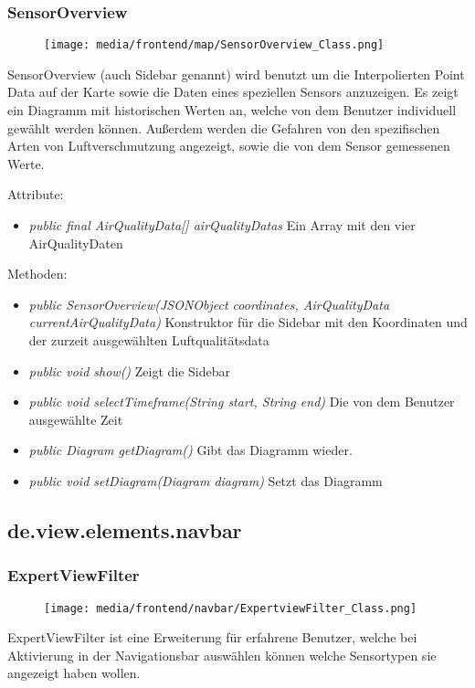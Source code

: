\subsubsection{SensorOverview}
\begin{minipage}{0.3\textwidth}
    \begin{figure}[H]
        \texttt{[image: media/frontend/map/SensorOverview\_Class.png]}
    \end{figure}
    \end{minipage} \hfill
    \begin{minipage}{0.6\textwidth}
SensorOverview (auch Sidebar genannt) wird benutzt um die Interpolierten Point Data auf der Karte sowie die Daten eines speziellen Sensors anzuzeigen. Es zeigt ein Diagramm mit historischen Werten an, welche von dem Benutzer individuell gewählt werden können. Außerdem werden die Gefahren von den spezifischen Arten von Luftverschmutzung angezeigt, sowie die von dem Sensor gemessenen Werte.
\end{minipage}

Attribute:
\begin{itemize} 
    \item \emph{public final AirQualityData[] airQualityDatas} Ein Array mit den vier AirQualityDaten
\end{itemize}
Methoden:
\begin{itemize} 
    \item \emph{public SensorOverview(JSONObject coordinates, AirQualityData currentAirQualityData)} Konstruktor für die Sidebar mit den Koordinaten und der zurzeit ausgewählten Luftqualitätsdata
    \item \emph{public void show()} Zeigt die Sidebar
    \item \emph{public void selectTimeframe(String start, String end)} Die von dem Benutzer ausgewählte Zeit
    \item \emph{public Diagram getDiagram()} Gibt das Diagramm wieder.
    \item \emph{public void setDiagram(Diagram diagram)} Setzt das Diagramm
\end{itemize}

\subsection{de.view.elements.navbar}

\subsubsection{ExpertViewFilter}
\begin{minipage}{0.3\textwidth}
    \begin{figure}[H]
        \texttt{[image: media/frontend/navbar/ExpertviewFilter\_Class.png]}
    \end{figure}
    \end{minipage} \hfill
    \begin{minipage}{0.6\textwidth}
ExpertViewFilter ist eine Erweiterung für erfahrene Benutzer, welche bei Aktivierung in der Navigationsbar auswählen können welche Sensortypen sie angezeigt haben wollen.
\end{minipage}

